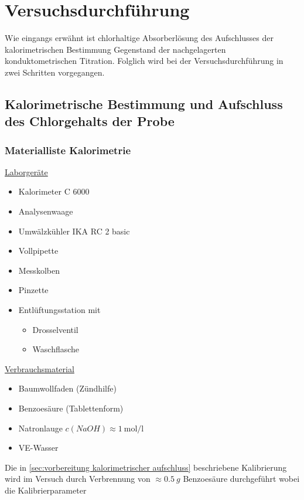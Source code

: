 \chapter{Versuchsdurchführung}
	Wie eingangs erwähnt ist chlorhaltige Absorberlösung des Aufschlusses der kalorimetrischen Bestimmung Gegenstand der nachgelagerten konduktometrischen Titration.
	Folglich wird bei der Versuchsdurchführung in zwei Schritten vorgegangen.
	\section{Kalorimetrische Bestimmung und Aufschluss des Chlorgehalts der Probe}\label{sec:kalorimeter bestimmung unbekannte probe}
		\subsection*{Materialliste Kalorimetrie}
			\underline{Laborgeräte}
			\begin{itemize}
				\item Kalorimeter C 6000
				\item Analysenwaage
				\item Umwälzkühler IKA RC 2 basic
				\item Vollpipette
				\item Messkolben
				\item Pinzette
				\item Entlüftungsstation mit
					\begin{itemize}
						\item Drosselventil
						\item Waschflasche
					\end{itemize}
			\end{itemize}

			\underline{Verbrauchsmaterial}
			\begin{itemize}
				\item Baumwollfaden (Zündhilfe)
				\item Benzoesäure (Tablettenform)
				\item Natronlauge \(c(NaOH) \approx \SI{1}{\mole\per\litre}\)
				\item VE-Wasser
			\end{itemize}
		Die in \cref{sec:vorbereitung kalorimetrischer aufschluss} beschriebene Kalibrierung wird im Versuch durch Verbrennung von \(\approx \SI{0,5}{g}\) Benzoesäure
		durchgeführt wobei die Kalibrierparameter

